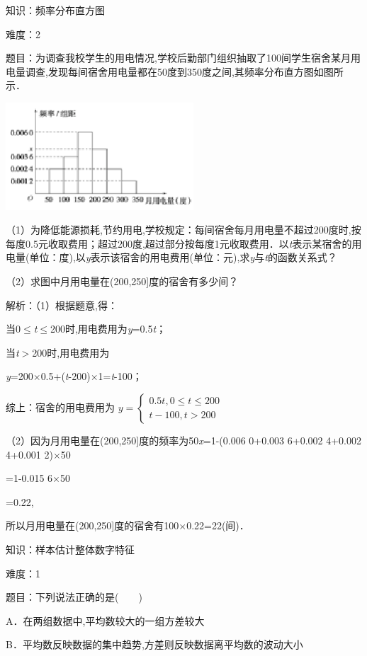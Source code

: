 \documentclass{article} %
\begin{document}
知识：频率分布直方图

难度：2

题目：为调查我校学生的用电情况,学校后勤部门组织抽取了100间学生宿舍某月用电量调查,发现每间宿舍用电量都在50度到350度之间,其频率分布直方图如图所示．

\includegraphics*[width=2.76in, height=1.58in, keepaspectratio=false]{image91}

（1）为降低能源损耗,节约用电,学校规定：每间宿舍每月用电量不超过200度时,按每度0.5元收取费用；超过200度,超过部分按每度1元收取费用．以\textit{t}表示某宿舍的用电量(单位：度),以\textit{y}表示该宿舍的用电费用(单位：元),求\textit{y}与\textit{t}的函数关系式？

（2）求图中月用电量在(200,250]度的宿舍有多少间？

解析：（1）根据题意,得：

当0$\mathrm{\le}$\textit{t}$\mathrm{\le}$200时,用电费用为\textit{y}=0.5\textit{t}；

当\textit{t}$\mathrm{>}$200时,用电费用为

\textit{y}=200$\mathrm{\times}$0.5+(\textit{t}-200)$\mathrm{\times}$1=\textit{t}-100；

综上：宿舍的用电费用为
$
y=
\left\{\begin{array}{l}
0.5t,0\le t\le200\\
t-100,t>200
\end{array}\right.
$

（2）因为月用电量在(200,250]度的频率为50\textit{x}=1-(0.006 0+0.003 6+0.002 4+0.002 4+0.001 2)$\mathrm{\times}$50

=1-0.015 6$\mathrm{\times}$50

=0.22,

所以月用电量在(200,250]度的宿舍有100$\mathrm{\times}$0.22=22(间)．


知识：样本估计整体数字特征

难度：1

题目：下列说法正确的是(　　)

A．在两组数据中,平均数较大的一组方差较大

B．平均数反映数据的集中趋势,方差则反映数据离平均数的波动大小
\end{document}
